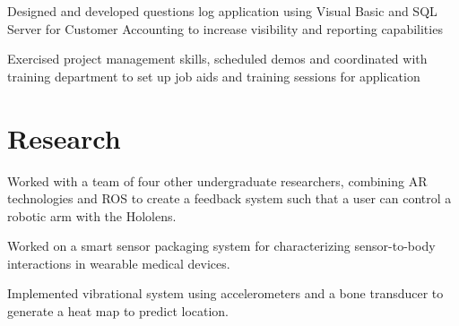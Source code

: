 \documentclass[]{deedy-resume-openfont}
\begin{document}
\begin{minipage}[t]{0.66\textwidth}
		\begin{tightemize}
			\item Designed and developed questions log application using Visual Basic and SQL Server for Customer Accounting to increase visibility and reporting capabilities \item	Exercised project management skills, scheduled demos and coordinated with training department to set up job aids and training sessions for application \end{tightemize}
		\sectionsep
		
		
		\section{Research}
		\begin{tightemize}
			\item Worked with a team of four other undergraduate researchers, combining AR technologies and ROS to create a feedback system such that a user can control a robotic arm with the Hololens.
		\end{tightemize}
		
		\sectionsep
		
		\begin{tightemize}
			\item Worked on a smart sensor packaging system for characterizing sensor-to-body interactions in wearable medical devices. 
			\item Implemented vibrational system using accelerometers and a bone transducer to generate a heat map to predict location. 
		\end{tightemize}
		\sectionsep
		
		
		

\end{minipage}
\end{document}
